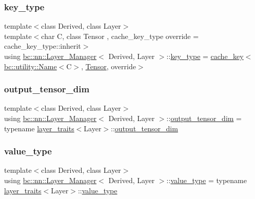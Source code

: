 \subsubsection{\texorpdfstring{key\+\_\+type}{key\_type}}
{\footnotesize\ttfamily template$<$class Derived, class Layer$>$ \\
template$<$char C, class Tensor , cache\+\_\+key\+\_\+type override = cache\+\_\+key\+\_\+type\+::inherit$>$ \\
using \hyperlink{structbc_1_1nn_1_1Layer__Manager}{bc\+::nn\+::\+Layer\+\_\+\+Manager}$<$ Derived, Layer $>$\+::\hyperlink{structbc_1_1nn_1_1Layer__Manager_a7b70f92269eee6d1110acf65cc988b67}{key\+\_\+type} =  \hyperlink{structbc_1_1nn_1_1cache__key}{cache\+\_\+key}$<$\hyperlink{structbc_1_1utility_1_1Name}{bc\+::utility\+::\+Name}$<$C$>$, \hyperlink{namespacebc_a659391e47ab612be3ba6c18cf9c89159}{Tensor}, override$>$}

\mbox{\label{structbc_1_1nn_1_1Layer__Manager_aabdbf2c4a435aa8256a9a7fac4ee3fc2}} 
\subsubsection{\texorpdfstring{output\+\_\+tensor\+\_\+dim}{output\_tensor\_dim}}
{\footnotesize\ttfamily template$<$class Derived, class Layer$>$ \\
using \hyperlink{structbc_1_1nn_1_1Layer__Manager}{bc\+::nn\+::\+Layer\+\_\+\+Manager}$<$ Derived, Layer $>$\+::\hyperlink{structbc_1_1nn_1_1Layer__Manager_aabdbf2c4a435aa8256a9a7fac4ee3fc2}{output\+\_\+tensor\+\_\+dim} =  typename \hyperlink{structbc_1_1nn_1_1layer__traits}{layer\+\_\+traits}$<$Layer$>$\+::\hyperlink{structbc_1_1nn_1_1Layer__Manager_aabdbf2c4a435aa8256a9a7fac4ee3fc2}{output\+\_\+tensor\+\_\+dim}}

\mbox{\label{structbc_1_1nn_1_1Layer__Manager_af6edd9edf47c73bfc1b200b3cbf2155f}} 
\subsubsection{\texorpdfstring{value\+\_\+type}{value\_type}}
{\footnotesize\ttfamily template$<$class Derived, class Layer$>$ \\
using \hyperlink{structbc_1_1nn_1_1Layer__Manager}{bc\+::nn\+::\+Layer\+\_\+\+Manager}$<$ Derived, Layer $>$\+::\hyperlink{structbc_1_1nn_1_1Layer__Manager_af6edd9edf47c73bfc1b200b3cbf2155f}{value\+\_\+type} =  typename \hyperlink{structbc_1_1nn_1_1layer__traits}{layer\+\_\+traits}$<$Layer$>$\+::\hyperlink{structbc_1_1nn_1_1Layer__Manager_af6edd9edf47c73bfc1b200b3cbf2155f}{value\+\_\+type}}




